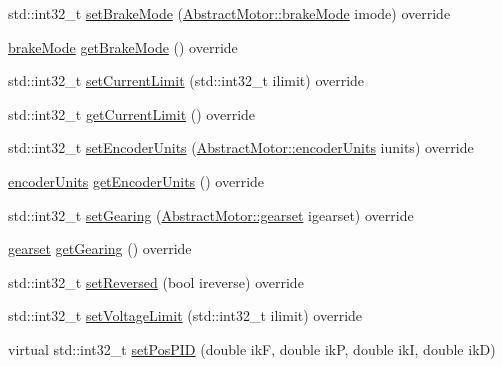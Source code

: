 \begin{DoxyCompactItemize}
\item 
std\+::int32\+\_\+t \mbox{\hyperlink{classokapi_1_1Motor_a2c40313fa5ff49c25947645885898f91}{set\+Brake\+Mode}} (\mbox{\hyperlink{classokapi_1_1AbstractMotor_a132e0485dbb59a60c3f934338d8fa601}{Abstract\+Motor\+::brake\+Mode}} imode) override
\item 
\mbox{\hyperlink{classokapi_1_1AbstractMotor_a132e0485dbb59a60c3f934338d8fa601}{brake\+Mode}} \mbox{\hyperlink{classokapi_1_1Motor_aec419fead574828b4b1b2642a424dcbe}{get\+Brake\+Mode}} () override
\item 
std\+::int32\+\_\+t \mbox{\hyperlink{classokapi_1_1Motor_ab54e856d8d55c1f53e1be113a9e90a00}{set\+Current\+Limit}} (std\+::int32\+\_\+t ilimit) override
\item 
std\+::int32\+\_\+t \mbox{\hyperlink{classokapi_1_1Motor_ae309fb32ea479cec950dfaa65f3ffebd}{get\+Current\+Limit}} () override
\item 
std\+::int32\+\_\+t \mbox{\hyperlink{classokapi_1_1Motor_a96466636470045aa63d81cb0effc9486}{set\+Encoder\+Units}} (\mbox{\hyperlink{classokapi_1_1AbstractMotor_ae811cd825099f2defadeb1b7f7e7764c}{Abstract\+Motor\+::encoder\+Units}} iunits) override
\item 
\mbox{\hyperlink{classokapi_1_1AbstractMotor_ae811cd825099f2defadeb1b7f7e7764c}{encoder\+Units}} \mbox{\hyperlink{classokapi_1_1Motor_afcc6183588ce056927878dfc479e6fee}{get\+Encoder\+Units}} () override
\item 
std\+::int32\+\_\+t \mbox{\hyperlink{classokapi_1_1Motor_a670cb230fe9686ce8fa71ee20607eb12}{set\+Gearing}} (\mbox{\hyperlink{classokapi_1_1AbstractMotor_a88aaa6ea2fa10f5520a537bbf26774d5}{Abstract\+Motor\+::gearset}} igearset) override
\item 
\mbox{\hyperlink{classokapi_1_1AbstractMotor_a88aaa6ea2fa10f5520a537bbf26774d5}{gearset}} \mbox{\hyperlink{classokapi_1_1Motor_a4dbe4aec1a4c6cb1cad659bada1ab8ed}{get\+Gearing}} () override
\item 
std\+::int32\+\_\+t \mbox{\hyperlink{classokapi_1_1Motor_a558e94850abf85132811a8b281e872df}{set\+Reversed}} (bool ireverse) override
\item 
std\+::int32\+\_\+t \mbox{\hyperlink{classokapi_1_1Motor_a5aab4b416675b7f7ee324fff4d8cda30}{set\+Voltage\+Limit}} (std\+::int32\+\_\+t ilimit) override
\item 
virtual std\+::int32\+\_\+t \mbox{\hyperlink{classokapi_1_1Motor_a13564c05ee3a9ce580850ef33280a7e9}{set\+Pos\+P\+ID}} (double ikF, double ikP, double ikI, double ikD)
\item 

\end{DoxyCompactItemize}
